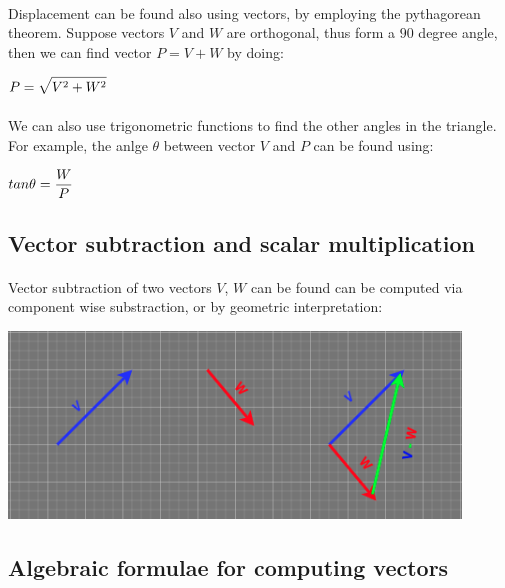 \documentclass[12pt, a4paper]{article}
\begin{document}
\paragraph*{}
Displacement can be found also using vectors, by employing the pythagorean
theorem. Suppose vectors $V$ and $W$ are orthogonal, thus form a $90$ degree angle,
then we can find vector $P = V + W$ by doing:

{
    \centering
    $\mathlarger{P = \sqrt{V^2 + W^2}}$

}

\paragraph*{}
We can also use trigonometric functions to find the other angles in the triangle. For example,
the anlge $\theta$ between vector $V$ and $P$ can be found using:

{
    \centering
    $\mathlarger{tan \theta = \frac{W}{P}}$

}

\newpage
\subsection{Vector subtraction and scalar multiplication}
\paragraph*{}
Vector subtraction of two vectors $V$, $W$ can be found can be computed via component wise
substraction, or by geometric interpretation: \\

{
    \centering
    \includegraphics[width=12cm]{phys_vec_sub.png}

}


\subsection{Algebraic formulae for computing vectors}
\end{document}
